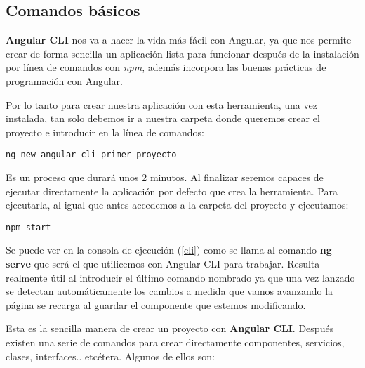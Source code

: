 \subsection{Comandos básicos}\label{cbasicos}
\textbf{Angular CLI} nos va a hacer la vida más fácil con Angular, ya que nos permite crear de forma sencilla un aplicación lista para funcionar después de la instalación por línea de comandos con \emph{npm}, además incorpora las buenas prácticas de programación con Angular. 


Por lo tanto para crear nuestra aplicación con esta herramienta, una vez instalada, tan solo debemos ir a nuestra carpeta donde queremos crear el proyecto e introducir en la línea de comandos: 
	\lstset{language=C, breaklines=true, basicstyle=\footnotesize}
		\begin{lstlisting}[frame=single]
		ng new angular-cli-primer-proyecto
    	\end{lstlisting}
 
 Es un proceso que durará unos 2 minutos.  Al finalizar seremos capaces de ejecutar directamente la aplicación por defecto que crea la herramienta. Para ejecutarla, al igual que antes accedemos a la carpeta del proyecto y ejecutamos:
 	\lstset{language=C, breaklines=true, basicstyle=\footnotesize}
		\begin{lstlisting}[frame=single]
		 npm start
    	\end{lstlisting}
    	
    	\label{cli}
    	
 Se puede ver en la consola de ejecución (\ref{cli}) como se llama al comando \textbf{ng serve} que será el que utilicemos con Angular CLI para trabajar. Resulta realmente útil al introducir el último comando nombrado ya que una vez lanzado se detectan automáticamente los cambios a medida que vamos avanzando la página se recarga al guardar el componente que estemos modificando.  
    	
    	
   Esta es la sencilla manera de crear un proyecto con \textbf{Angular CLI}. Después existen una serie de comandos para crear directamente componentes, servicios, clases, interfaces.. etcétera.  Algunos de ellos son:
   
